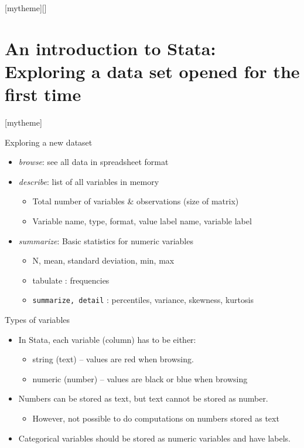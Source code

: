 \documentclass[aspectratio=169]{beamer}
\newcommand{\sectionpic}[2]{
	\setbeamertemplate{section page}[mytheme][#2]
	\section{#1}
	\setbeamertemplate{section page}[mytheme]
}
\begin{document}
\sectionpic{An introduction to Stata: \newline Exploring a data set opened for the first time}{}


\begin{frame}{Exploring a new dataset}
\begin{itemize}
\item {\protect\textit{browse}}: see all data in spreadsheet format
\item \textit {describe}: list of all variables in memory
	\begin{itemize}
		\item Total number of variables \& observations (size of matrix)
		\item Variable name, type, format, value label name, variable label
	\end{itemize}
\item \textit {summarize}: Basic statistics for numeric variables
	\begin{itemize}
		\item N, mean, standard deviation, min, max
		\item tabulate : frequencies
		\item \texttt{summarize, detail} : percentiles, variance, skewness, kurtosis
	\end{itemize}
\end{itemize}
\end{frame}


\begin{frame}{Types of variables}
\begin{itemize}
	\item In Stata, each variable (column) has to be either:
	\begin{itemize}
		\item string (text) – values are red when browsing.
		\item numeric (number) – values are black or blue when browsing
	\end{itemize}
	\item Numbers can be stored as text, but text cannot be stored as number. 
	\begin{itemize}
		\item 	However, not possible to do computations on numbers stored as text 
	\end{itemize}
	\item Categorical variables should be stored as numeric variables and have labels.
\end{itemize}
\end{frame}
\end{document}
